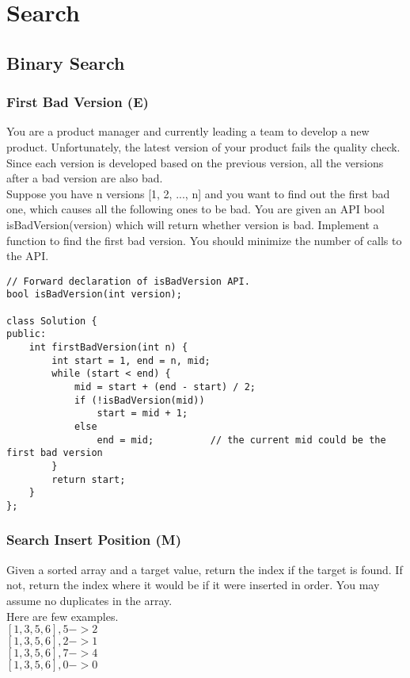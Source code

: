 \chapter{Search}

\section{Binary Search}


\subsection{First Bad Version (E)}
You are a product manager and currently leading a team to develop a new product. Unfortunately, the latest version of your product fails the quality check. Since each version is developed based on the previous version, all the versions after a bad version are also bad.\\

Suppose you have n versions [1, 2, ..., n] and you want to find out the first bad one, which causes all the following ones to be bad. You are given an API bool isBadVersion(version) which will return whether version is bad. Implement a function to find the first bad version. You should minimize the number of calls to the API. \\

\begin{lstlisting}
// Forward declaration of isBadVersion API.
bool isBadVersion(int version);

class Solution {
public:
    int firstBadVersion(int n) {
        int start = 1, end = n, mid;
        while (start < end) {
            mid = start + (end - start) / 2;
            if (!isBadVersion(mid))
                start = mid + 1;
            else
                end = mid;          // the current mid could be the first bad version
        }
        return start;
    }
};
\end{lstlisting}


\subsection{Search Insert Position (M)}
Given a sorted array and a target value, return the index if the target is found. If not, return the index where it would be if it were inserted in order. 
You may assume no duplicates in the array.\\

Here are few examples.\\
$[1,3,5,6], 5 -> 2$\\
$[1,3,5,6], 2 -> 1$\\
$[1,3,5,6], 7 -> 4$\\
$[1,3,5,6], 0 -> 0$\\

